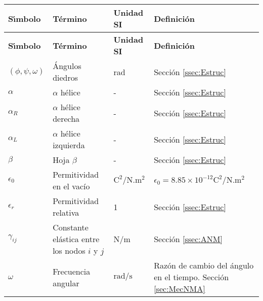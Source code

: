 \begin{longtable}{p{2cm}p{3.5cm}p{2cm}p{8cm}}
\textbf{S\'{\i}mbolo}&\textbf{T\'{e}rmino}&\textbf{Unidad SI}&\textbf{Definici\'{o}n}\\[0.5ex] \hline%
\endfirsthead%
\textbf{S\'{\i}mbolo}&\textbf{T\'{e}rmino}&\textbf{Unidad SI}&\textbf{Definici\'{o}n}\\[0.5ex] \hline%
\endhead%
\renewcommand{\arraystretch}{1.3}
 \label{simbolosg}
 $(\phi,\psi,\omega)$&\'{A}ngulos diedros&rad &Secci\'{o}n \ref{ssec:Estruc} \\
 $\alpha$ &$\alpha$ h\'{e}lice&- &Secci\'{o}n \ref{ssec:Estruc}\\
     $\alpha_R$&$\alpha$ h\'{e}lice derecha&- &Secci\'{o}n \ref{ssec:Estruc}\\
     $\alpha_L$&$\alpha$ h\'{e}lice izquierda&- &Secci\'{o}n \ref{ssec:Estruc} \\
  $\beta$&Hoja $\beta$&- &Secci\'{o}n \ref{ssec:Estruc} \\
  $\epsilon_0$&Permitividad en el vac\'{i}o&$\mathrm{C^2/N.m^2}$&$\epsilon_0=8.85\times 10^{-12}\mathrm{C^2/N.m^2}$ \\ 
   $\epsilon_r$&Permitividad relativa&1&Secci\'{o}n \ref{ssec:Estruc} \\
   $\gamma_{ij}$&Constante el\'{a}stica entre los nodos $i$ y $j$&N/m&Secci\'{o}n \ref{ssec:ANM} \\
   $\omega$&Frecuencia angular&$\mathrm{rad/s}$&Raz\'{o}n de cambio del \'{a}ngulo en el tiempo. Secci\'{o}n \ref{sec:MecNMA}\\%
     \hline
\end{longtable}



